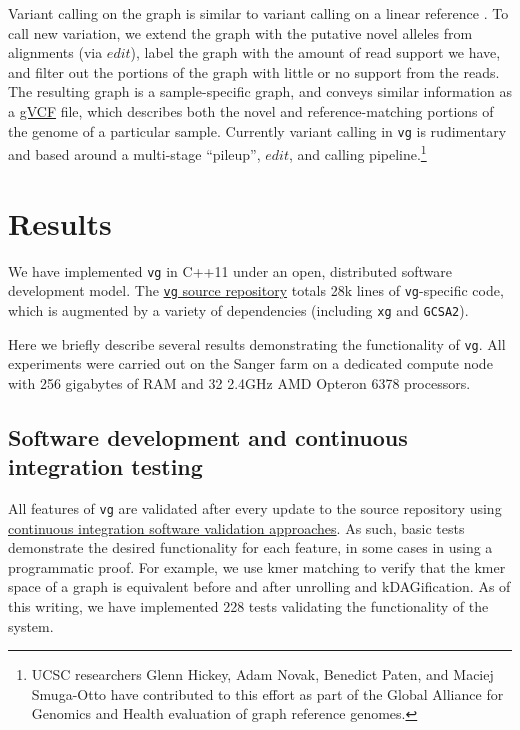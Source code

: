 \documentclass{article}
\begin{document}
Variant calling on the graph is similar to variant calling on a linear reference \cite{samtools, garrison2012haplotype}.
To call new variation, we extend the graph with the putative novel alleles from alignments (via $edit$), label the graph with the amount of read support we have, and filter out the portions of the graph with little or no support from the reads.
The resulting graph is a sample-specific graph, and conveys similar information as a \href{http://samtools.github.io/hts-specs/VCFv4.2.pdf}{gVCF} file, which describes both the novel and reference-matching portions of the genome of a particular sample.
Currently variant calling in {\tt vg} is rudimentary and based around a multi-stage ``pileup'', $edit$, and calling pipeline.\footnote{UCSC researchers Glenn Hickey, Adam Novak, Benedict Paten, and Maciej Smuga-Otto have contributed to this effort as part of the Global Alliance for Genomics and Health evaluation of graph reference genomes.}

\section{Results}

We have implemented {\tt vg} in C++11 under an open, distributed software development model.
The \href{https://github.com/vgteam/vg}{{\tt vg} source repository} totals 28k lines of {\tt vg}-specific code, which is augmented by a variety of dependencies (including {\tt xg} and {\tt GCSA2}).

Here we briefly describe several results demonstrating the functionality of {\tt vg}.
All experiments were carried out on the Sanger farm on a dedicated compute node with 256 gigabytes of RAM and 32 2.4GHz AMD Opteron 6378 processors.

\subsection{Software development and continuous integration testing}

All features of {\tt vg} are validated after every update to the source repository using \href{https://travis-ci.org/vgteam/vg}{continuous integration software validation approaches}.
As such, basic tests demonstrate the desired functionality for each feature, in some cases in using a programmatic proof.
For example, we use kmer matching to verify that the kmer space of a graph is equivalent before and after unrolling and kDAGification.
As of this writing, we have implemented 228 tests validating the functionality of the system.
\end{document}
